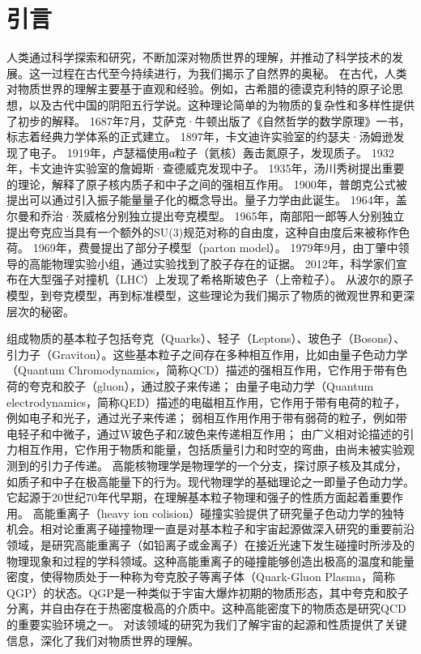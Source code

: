 
\chapter{引言}

  人类通过科学探索和研究，不断加深对物质世界的理解，并推动了科学技术的发展。这一过程在古代至今持续进行，为我们揭示了自然界的奥秘。
  在古代，人类对物质世界的理解主要基于直观和经验。例如，古希腊的德谟克利特的原子论思想，以及古代中国的阴阳五行学说。这种理论简单的为物质的复杂性和多样性提供了初步的解释。
  1687年7月，艾萨克·牛顿出版了《自然哲学的数学原理》一书，标志着经典力学体系的正式建立。
  1897年，卡文迪许实验室的约瑟夫·汤姆逊发现了电子。
  1919年，卢瑟福使用α粒子（氦核）轰击氮原子，发现质子。
  1932年，卡文迪许实验室的詹姆斯·查德威克发现中子。
  1935年，汤川秀树提出重要的理论，解释了原子核内质子和中子之间的强相互作用。
  1900年，普朗克公式被提出可以通过引入振子能量量子化的概念导出。量子力学由此诞生。
  1964年，盖尔曼和乔治·茨威格分别独立提出夸克模型。
  1965年，南部阳一郎等人分别独立提出夸克应当具有一个额外的SU(3)规范对称的自由度，这种自由度后来被称作色荷。
  1969年，费曼提出了部分子模型（parton model）。
  1979年9月，由丁肇中领导的高能物理实验小组，通过实验找到了胶子存在的证据。
  2012年，科学家们宣布在大型强子对撞机（LHC）上发现了希格斯玻色子（上帝粒子）。
  从波尔的原子模型，到夸克模型，再到标准模型，这些理论为我们揭示了物质的微观世界和更深层次的秘密。
  
	组成物质的基本粒子包括夸克（Quarks）、轻子（Leptons）、玻色子（Bosons）、引力子（Graviton）。这些基本粒子之间存在多种相互作用，比如由量子色动力学（Quantum Chromodynamics，简称QCD）描述的强相互作用，它作用于带有色荷的夸克和胶子（gluon），通过胶子来传递；
	由量子电动力学（Quantum electrodynamics，简称QED）描述的电磁相互作用，它作用于带有电荷的粒子，例如电子和光子，通过光子来传递；
	弱相互作用作用于带有弱荷的粒子，例如带电轻子和中微子，通过W玻色子和Z玻色来传递相互作用；
	由广义相对论描述的引力相互作用，它作用于物质和能量，包括质量引力和时空的弯曲，由尚未被实验观测到的引力子传递。
	高能核物理学是物理学的一个分支，探讨原子核及其成分，如质子和中子在极高能量下的行为。现代物理学的基础理论之一即量子色动力学。它起源于20世纪70年代早期，在理解基本粒子物理和强子的性质方面起着重要作用。
	高能重离子（heavy ion colision）碰撞实验提供了研究量子色动力学的独特机会。相对论重离子碰撞物理一直是对基本粒子和宇宙起源做深入研究的重要前沿领域，是研究高能重离子（如铅离子或金离子）在接近光速下发生碰撞时所涉及的物理现象和过程的学科领域。这种高能重离子的碰撞能够创造出极高的温度和能量密度，使得物质处于一种称为夸克胶子等离子体（Quark-Gluon Plasma，简称QGP）的状态。QGP是一种类似于宇宙大爆炸初期的物质形态，其中夸克和胶子分离，并自由存在于热密度极高的介质中。这种高能密度下的物质态是研究QCD的重要实验环境之一。
	对该领域的研究为我们了解宇宙的起源和性质提供了关键信息，深化了我们对物质世界的理解。

